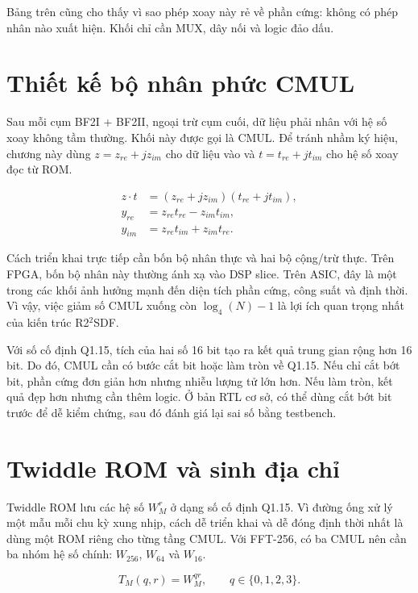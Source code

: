 \documentclass[12pt,a4paper]{report}
\numberwithin{equation}{chapter}
\begin{document}
Bảng trên cũng cho thấy vì sao phép xoay này rẻ về phần cứng: không có phép nhân nào xuất hiện. Khối chỉ cần MUX, dây nối và logic đảo dấu.

\section{Thiết kế bộ nhân phức CMUL}
\label{sec:r22rtl_cmul}

Sau mỗi cụm BF2I + BF2II, ngoại trừ cụm cuối, dữ liệu phải nhân với hệ số xoay không tầm thường. Khối này được gọi là CMUL. Để tránh nhầm ký hiệu, chương này dùng $z=z_{re}+jz_{im}$ cho dữ liệu vào và $t=t_{re}+jt_{im}$ cho hệ số xoay đọc từ ROM.

\begin{align}
    z\cdot t &= (z_{re}+jz_{im})(t_{re}+jt_{im}),
    \label{eq:r22rtl_cmul_complex}\\
    y_{re} &= z_{re}t_{re}-z_{im}t_{im},
    \label{eq:r22rtl_cmul_re}\\
    y_{im} &= z_{re}t_{im}+z_{im}t_{re}.
    \label{eq:r22rtl_cmul_im}
\end{align}

Cách triển khai trực tiếp cần bốn bộ nhân thực và hai bộ cộng/trừ thực. Trên FPGA, bốn bộ nhân này thường ánh xạ vào DSP slice. Trên ASIC, đây là một trong các khối ảnh hưởng mạnh đến diện tích phần cứng, công suất và định thời. Vì vậy, việc giảm số CMUL xuống còn $\log_4(N)-1$ là lợi ích quan trọng nhất của kiến trúc R2$^2$SDF.

Với số cố định Q1.15, tích của hai số 16 bit tạo ra kết quả trung gian rộng hơn 16 bit. Do đó, CMUL cần có bước cắt bit hoặc làm tròn về Q1.15. Nếu chỉ cắt bớt bit, phần cứng đơn giản hơn nhưng nhiễu lượng tử lớn hơn. Nếu làm tròn, kết quả đẹp hơn nhưng cần thêm logic. Ở bản RTL cơ sở, có thể dùng cắt bớt bit trước để dễ kiểm chứng, sau đó đánh giá lại sai số bằng testbench.

\section{Twiddle ROM và sinh địa chỉ}
\label{sec:r22rtl_twiddle_rom}

Twiddle ROM lưu các hệ số $W_M^r$ ở dạng số cố định Q1.15. Vì đường ống xử lý một mẫu mỗi chu kỳ xung nhịp, cách dễ triển khai và dễ đóng định thời nhất là dùng một ROM riêng cho từng tầng CMUL. Với FFT-256, có ba CMUL nên cần ba nhóm hệ số chính: $W_{256}$, $W_{64}$ và $W_{16}$.

\begin{equation}
    T_M(q,r)=W_M^{qr},\qquad q\in\{0,1,2,3\}.
    \label{eq:r22rtl_twiddle_tm}
\end{equation}
\end{document}
